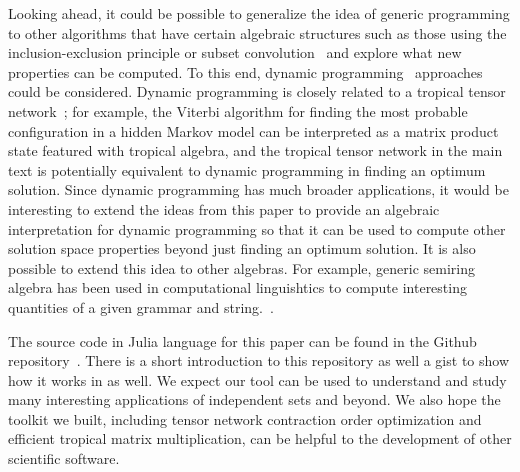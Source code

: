 \documentclass[review, onefignum, onetabnum]{siamart190516}
\begin{document}
Looking ahead, it could be possible to generalize the idea of generic programming to other algorithms that have certain algebraic structures such as those using the inclusion-exclusion principle or subset convolution~\cite{Fomin2013} and explore what new properties can be computed.
To this end, dynamic programming~\cite{Courcelle1990, Fomin2013} approaches could be considered.
Dynamic programming is closely related to a tropical tensor network~\cite{Liu2021}; for example, the Viterbi algorithm for finding the most probable configuration in a hidden Markov model can be interpreted as a matrix product state featured with tropical algebra, and the tropical tensor network in the main text is potentially equivalent to dynamic programming in finding an optimum solution.
Since dynamic programming has much broader applications, it would be interesting to extend the ideas from this paper to provide an algebraic interpretation for dynamic programming so that it can be used to compute other solution space properties beyond just finding an optimum solution.
It is also possible to extend this idea to other algebras. For example, generic semiring algebra has been used in computational linguishtics to compute interesting quantities of a given grammar and string.~\cite{Goodman1999}.

The source code in Julia language for this paper can be found in the Github repository~\cite{GenericTensorNetworks}. 
There is a short introduction to this repository as well a gist to show how it works in  as well.
We expect our tool can be used to understand and study many interesting applications of independent sets and beyond.
We also hope the toolkit we built, including tensor network contraction order optimization and efficient tropical matrix multiplication, can be helpful to the development of other scientific software.

\end{document}
